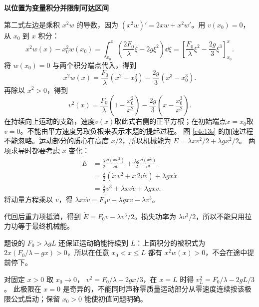 \begin{solution}
\par\medskip{}\noindent\textbf{以位置为变量积分并限制可达区间}\par\nobreak
第二式左边是乘积 $x^2w$ 的导数，因为 $(x^2w)'=2xw+x^2w'$。用 $v(x_0)=0$，从 $x_0$ 到 $x$ 积分：
\[
 x^2w(x)-x_0^2w(x_0)
 =\int_{x_0}^{x}\left(\frac{2F_0}{\lambda}\xi-2g\xi^2\right)\dd\xi
 =\left[\frac{F_0}{\lambda}\xi^2-\frac{2g}{3}\xi^3\right]_{x_0}^{x}.
\]
将 $w(x_0)=0$ 与两个积分端点代入，得到
\[
 x^2w(x)
 =\frac{F_0}{\lambda}(x^2-x_0^2)
 -\frac{2g}{3}(x^3-x_0^3).
\]
再除以 $x^2>0$，得到
\[
 \boxed{v^2(x)=\frac{F_0}{\lambda}\left(1-\frac{x_0^2}{x^2}\right)
 -\frac{2g}{3}\left(x-\frac{x_0^3}{x^2}\right)}.
\]
在持续向上运动的支路，速度$v(x)$取此式右侧的正平方根；在初始端点$x=x_0$取$v=0$。不能由平方速度另取负根来表示本题的提起过程。
图 \ref{c4e13s} 的加速过程不能忽略。运动部分的质心在高度 $x/2$，所以机械能为
$E=\lambda xv^2/2+\lambda gx^2/2$。
两项求导时都要考虑 $x$ 变化：
\begin{align*}
\dot E&=\frac\lambda2\frac{\dd(xv^2)}{\dd t}
       +\frac{\lambda g}{2}\frac{\dd(x^2)}{\dd t}\\
&=\frac\lambda2(\dot x\,v^2+x\,2v\dot v)
       +\lambda gx\dot x\\
&=\frac\lambda2v^3+\lambda xv\dot v+\lambda gxv.
\end{align*}
将动量方程乘以 $v$，得
$\lambda xv\dot v=F_0v-\lambda gxv-\lambda v^3$。

代回后重力项抵消，得到 $\dot E=F_0v-\lambda v^3/2$。损失功率为 $\lambda v^3/2$，所以不能只用拉力功等于最终机械能。

题设的 $F_0>\lambda gL$ 还保证运动确能持续到 $L$：上面积分的被积式为 $2x(F_0/\lambda-gx)>0$，所以在任意 $x_0<x\le L$ 都有 $x^2w(x)>0$，不会在途中提前停下。

对固定 $x>0$ 取 $x_0\to0$，
$v^2=F_0/\lambda-2gx/3$，在 $x=L$ 时得
$v_L^2=F_0/\lambda-2gL/3$。
此极限在 $x=0$ 是奇异的，不能同时声称零质量运动部分从零速度连续按该极限公式启动；保留 $x_0>0$ 能使初值问题明确。
\end{solution}

